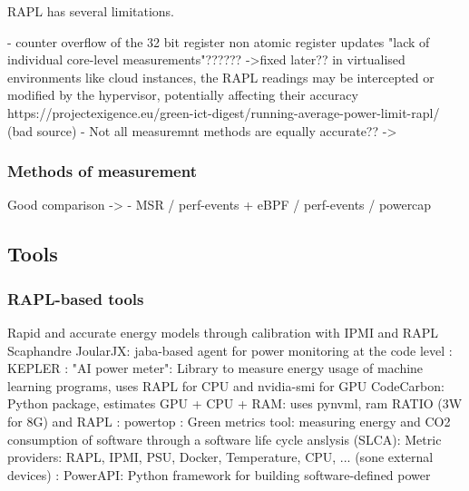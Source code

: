RAPL has several limitations. 

- counter overflow of the 32 bit register
non atomic register updates
"lack of individual core-level measurements"?????? ->fixed later??
in virtualised environments like cloud instances, the RAPL readings may be intercepted or modified by the hypervisor, potentially affecting their accuracy
    https://projectexigence.eu/green-ict-digest/running-average-power-limit-rapl/ (bad source)
- Not all measuremnt methods are equally accurate?? -> \parencite{raffin2024dissecting}

\subsubsection{Methods of measurement}
Good comparison -> \parencite{raffin2024dissecting}
- MSR / perf-events + eBPF / perf-events / powercap


\subsection{Tools}
\subsubsection{RAPL-based tools}
\label{sec:rapltools}

\parencite{kavanagh2019rapid} Rapid and accurate energy models through calibration with IPMI and RAPL
\parencite{scaphandre_documentation} Scaphandre
\parencite{joularjx} JoularJX: jaba-based agent for power monitoring at the code level
\parencite{kepler_energy}: KEPLER
\parencite{aipowermeter}: "AI power meter": Library to measure energy usage of machine learning programs, uses RAPL for CPU and nvidia-smi for GPU
\parencite{codecarbon} CodeCarbon: Python package, estimates GPU + CPU + RAM: uses pynvml, ram RATIO (3W for 8G) and RAPL
\parencite{powertop}: powertop
\parencite{greencodingdocs}: Green metrics tool: measuring energy and CO2 consumption of software through a software life cycle anslysis (SLCA): Metric providers: RAPL, IPMI, PSU, Docker, Temperature, CPU, ... (sone external devices)
\parencite{fieni2024powerapi}: PowerAPI: Python framework for building software-defined power